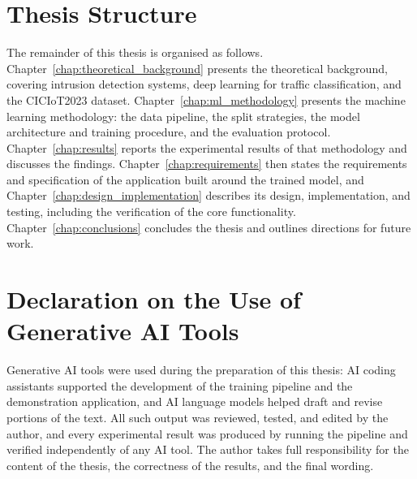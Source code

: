 \section{Thesis Structure}
\label{sec:intro_structure}

\par The remainder of this thesis is organised as follows. Chapter~\ref{chap:theoretical_background} presents the theoretical background, covering intrusion detection systems, deep learning for traffic classification, and the CICIoT2023 dataset. Chapter~\ref{chap:ml_methodology} presents the machine learning methodology: the data pipeline, the split strategies, the model architecture and training procedure, and the evaluation protocol. Chapter~\ref{chap:results} reports the experimental results of that methodology and discusses the findings. Chapter~\ref{chap:requirements} then states the requirements and specification of the application built around the trained model, and Chapter~\ref{chap:design_implementation} describes its design, implementation, and testing, including the verification of the core functionality. Chapter~\ref{chap:conclusions} concludes the thesis and outlines directions for future work.

\section{Declaration on the Use of Generative AI Tools}
\label{sec:intro_ai_declaration}

\par Generative AI tools were used during the preparation of this thesis: AI coding assistants supported the development of the training pipeline and the demonstration application, and AI language models helped draft and revise portions of the text. All such output was reviewed, tested, and edited by the author, and every experimental result was produced by running the pipeline and verified independently of any AI tool. The author takes full responsibility for the content of the thesis, the correctness of the results, and the final wording.
